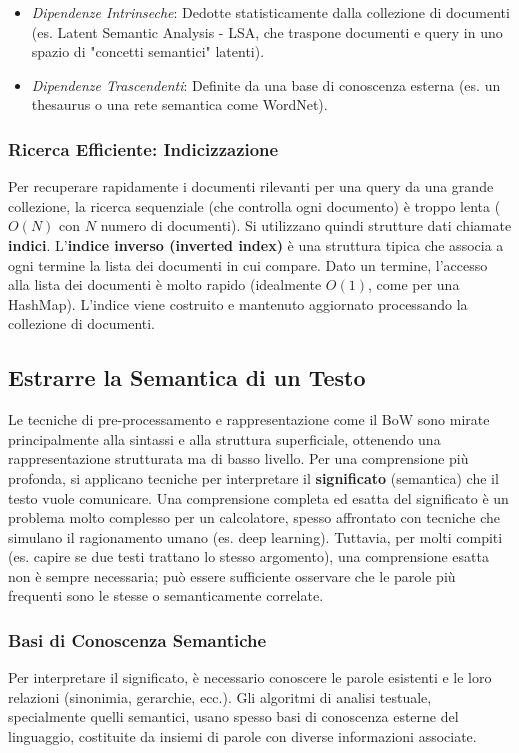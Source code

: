 \documentclass{article}
\begin{document}
\begin{itemize}
          \begin{itemize}
              \item \textit{Dipendenze Intrinseche}: Dedotte statisticamente dalla collezione di documenti (es. Latent Semantic Analysis - LSA, che traspone documenti e query in uno spazio di "concetti semantici" latenti).
              \item \textit{Dipendenze Trascendenti}: Definite da una base di conoscenza esterna (es. un thesaurus o una rete semantica come WordNet).
          \end{itemize}
\end{itemize}

\subsubsection{Ricerca Efficiente: Indicizzazione}
Per recuperare rapidamente i documenti rilevanti per una query da una grande collezione, la ricerca sequenziale (che controlla ogni documento) è troppo lenta ($O(N)$ con $N$ numero di documenti). Si utilizzano quindi strutture dati chiamate \textbf{indici}.
L'\textbf{indice inverso (inverted index)} è una struttura tipica che associa a ogni termine la lista dei documenti in cui compare. Dato un termine, l'accesso alla lista dei documenti è molto rapido (idealmente $O(1)$, come per una HashMap). L'indice viene costruito e mantenuto aggiornato processando la collezione di documenti.

\subsection{Estrarre la Semantica di un Testo}
Le tecniche di pre-processamento e rappresentazione come il BoW sono mirate principalmente alla sintassi e alla struttura superficiale, ottenendo una rappresentazione strutturata ma di basso livello. Per una comprensione più profonda, si applicano tecniche per interpretare il \textbf{significato} (semantica) che il testo vuole comunicare.
Una comprensione completa ed esatta del significato è un problema molto complesso per un calcolatore, spesso affrontato con tecniche che simulano il ragionamento umano (es. deep learning). Tuttavia, per molti compiti (es. capire se due testi trattano lo stesso argomento), una comprensione esatta non è sempre necessaria; può essere sufficiente osservare che le parole più frequenti sono le stesse o semanticamente correlate.

\subsubsection{Basi di Conoscenza Semantiche}
Per interpretare il significato, è necessario conoscere le parole esistenti e le loro relazioni (sinonimia, gerarchie, ecc.). Gli algoritmi di analisi testuale, specialmente quelli semantici, usano spesso basi di conoscenza esterne del linguaggio, costituite da insiemi di parole con diverse informazioni associate.
\end{document}
